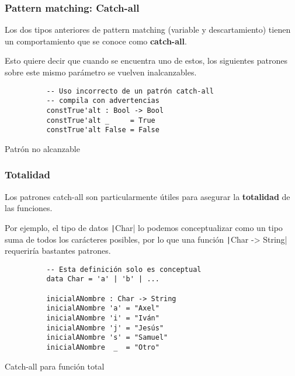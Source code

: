 \documentclass{beamer}
\begin{document}
\begin{frame}[fragile]
  \frametitle{Pattern matching: Catch-all}

  Los dos tipos anteriores de pattern matching (variable y descartamiento) tienen
  un comportamiento que se conoce como \textbf{catch-all}.

  Esto quiere decir que cuando se encuentra uno  de estos, los siguientes patrones
  sobre este mismo parámetro se vuelven inalcanzables.

  \begin{listing}[H]
    \begin{center}
      \begin{minipage}{0.42\textwidth}
          \begin{verbatim}
          -- Uso incorrecto de un patrón catch-all
          -- compila con advertencias
          constTrue'alt : Bool -> Bool
          constTrue'alt _     = True
          constTrue'alt False = False
          \end{verbatim}
      \end{minipage}
    \end{center}
    \caption{Patrón no alcanzable}
    \label{lst:matchunreachable}
  \end{listing}
\end{frame}

\begin{frame}[fragile]
  \frametitle{Totalidad}

  Los patrones catch-all son particularmente útiles para asegurar la
  \textbf{totalidad} de las funciones.

  Por ejemplo, el tipo de datos \texttt|Char| lo podemos conceptualizar como
  un tipo suma de todos los carácteres posibles, por lo que una función
  \texttt|Char -> String| requeriría bastantes patrones.

  \begin{listing}[H]
    \begin{center}
      \begin{minipage}{0.42\textwidth}
          \begin{verbatim}
          -- Esta definición solo es conceptual
          data Char = 'a' | 'b' | ...

          inicialANombre : Char -> String
          inicialANombre 'a' = "Axel"
          inicialANombre 'i' = "Iván"
          inicialANombre 'j' = "Jesús"
          inicialANombre 's' = "Samuel"
          inicialANombre  _  = "Otro"
          \end{verbatim}
      \end{minipage}
    \end{center}
    \caption{Catch-all para función total}
    \label{lst:catchalltotal}
  \end{listing}
\end{frame}
\end{document}

